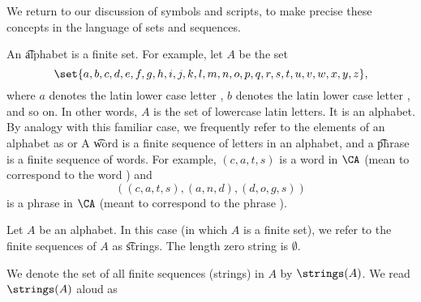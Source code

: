 

We return to our discussion of symbols and scripts, to make precise these concepts in the language of sets and sequences.


An \t{alphabet} is a finite set.
For example, let $A$ be the set
  \[
\set{a, b, c, d, e, f,g,h,i,j,k,l,m,n,o,p,q,r,s,t,u,v,w, x, y,z},
  \]
where $a$ denotes the latin lower case letter , $b$ denotes the latin lower case letter , and so on.
In other words, $A$ is the set of lowercase latin letters.
It is an alphabet.
By analogy with this familiar case, we frequently refer to the elements of an alphabet as  or 
A \t{word} is a finite sequence of letters in an alphabet, and a \t{phrase} is a finite sequence of words.
For example, $(c,a,t,s)$ is a word in $\CA$ (mean to correspond to the word ) and
    \[
((c,a,t,s), (a,n,d), (d,o,g,s))
    \]
is a phrase in $\CA$ (meant to correspond to the phrase ).

Let $A$ be an alphabet.
In this case (in which $A$ is a finite set), we refer to the finite sequences of $A$ as \t{strings}.
The length zero string is $\emptyset$.


We denote the set of all finite sequences (strings) in $A$ by $\strings(A)$.
We read $\strings(A)$ aloud as 



\blankpage
